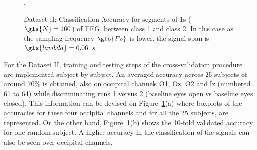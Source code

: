 \begin{figure}[h!]
\centering
{}
\caption[PhysioNet Dataset Binary Classification Accuracy]{Dataset II: Classification Accuracy for segments of 1s ($\gls{N} = 160$) of EEG, between class 1 and class 2.  In this case as the sampling frequency $\gls{Fs}$ is lower, the signal span is $\gls{lambda} = 0.06$   $\si{s}$}.
\label{fig:alpharesultsdatasetii}
\end{figure}


For the Dataset II, training and testing steps of the cross-validation procedure are implemented subject by subject.  An averaged accuracy across 25 subjects of around $70\%$ is obtained, also on occipital channels O1, Oz, O2 and Iz (numbered 61 to 64) while discriminating runs 1 versus 2 (baseline eyes open vs baseline eyes closed).  This information can be devised on Figure~\ref{fig:alpharesultsdatasetii}(a) where boxplots of the accuracies for these four occipital channels and for all the 25 subjects, are represented.  On the other hand, Figure~\ref{fig:alpharesultsdatasetii}(b) shows the 10-fold validated accuracy for one random subject. A higher accuracy in the classification of the signals can also be seen over occipital channels.

